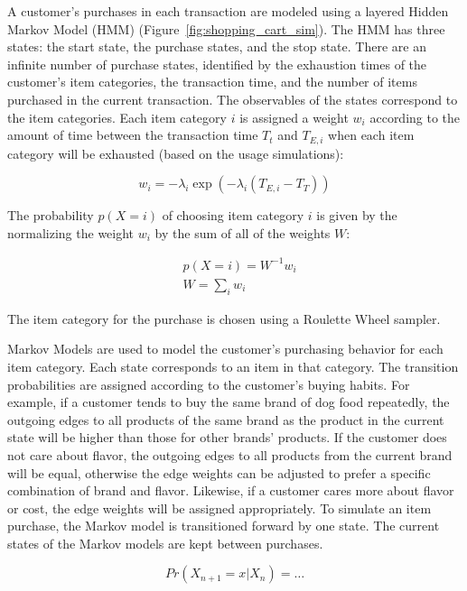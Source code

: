 \documentclass[conference]{IEEEtran}
\begin{document}
A customer's purchases in each transaction are modeled using a layered Hidden Markov Model (HMM) (Figure~\ref{fig:shopping_cart_sim}).  The HMM has three states: the start state, the purchase states, and the stop state. There are an infinite number of purchase states, identified by the exhaustion times of the customer's item categories, the transaction time, and the number of items purchased in the current transaction. The observables of the states correspond to the item categories.  Each item category $i$ is assigned a weight $w_i$ according to the amount of time between the transaction time $T_t$ and $T_{E,i}$ when each item category will be exhausted (based on the usage simulations):

\begin{equation}
w_i = - \lambda_i \exp(-\lambda_i (T_{E, i}- T_{T}))
\end{equation}

The probability $p(X=i)$ of choosing item category $i$ is given by the normalizing the weight $w_i$ by the sum of all of the weights $W$:

\begin{align}
&p(X=i) = W^{-1} w_i \\
&W = \sum_i w_i \nonumber
\end{align}

The item category for the purchase is chosen using a Roulette Wheel sampler.

Markov Models are used to model the customer's purchasing behavior for each item category.  Each state corresponds to an item in that category. The transition probabilities are assigned according to the customer's buying habits.  For example, if a customer tends to buy the same brand of dog food repeatedly, the outgoing edges to all products of the same brand as the product in the current state will be higher than those for other brands' products. If the customer does not care about flavor, the outgoing edges to all products from the current brand will be equal, otherwise the edge weights can be adjusted to prefer a specific combination of brand and flavor.  Likewise, if a customer cares more about flavor or cost, the edge weights will be assigned appropriately.  To simulate an item purchase, the Markov model is transitioned forward by one state.  The current states of the Markov models are kept between purchases.

\begin{equation}
Pr(X_{n+1}=x|X_n) = \dots
\end{equation} 
\end{document}
